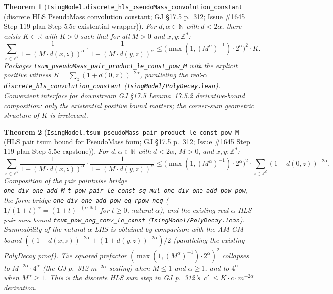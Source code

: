 \documentclass[a4paper,11pt]{article}
\newtheorem{theorem}{Theorem}
\begin{document}
\begin{theorem}[\texttt{IsingModel.discrete\_hls\_pseudoMass\_convolution\_constant}
(discrete HLS PseudoMass convolution constant; GJ \S17.5 p.~312;
Issue \#1645 Step 119 plan Step 5.5c existential wrapper)]
For $d, \alpha \in \mathbb{N}$ with $d < 2\alpha$, there exists $K \in \mathbb{R}$
with $K > 0$ such that for all $M > 0$ and $x, y : \mathbb{Z}^d$:
\[
  \sum_{z \in \mathbb{Z}^d}
    \frac{1}{1+(M\cdot d(x,z))^\alpha}\cdot\frac{1}{1+(M\cdot d(y,z))^\alpha}
  \le \bigl(\max(1, (M^\alpha)^{-1})\cdot 2^\alpha\bigr)^2 \cdot K.
\]
Packages \texttt{tsum\_pseudoMass\_pair\_product\_le\_const\_pow\_M} with the
explicit positive witness $K = \sum_z (1 + d(0, z))^{-2\alpha}$, paralleling
the real-$\alpha$ \texttt{discrete\_hls\_convolution\_constant}
(\texttt{IsingModel/PolyDecay.lean}). Convenient interface for downstream GJ
\S17.5 Lemma~17.5.2 derivative-bound composition: only the existential positive
bound matters; the corner-sum geometric structure of $K$ is irrelevant.
\end{theorem}

\begin{theorem}[\texttt{IsingModel.tsum\_pseudoMass\_pair\_product\_le\_const\_pow\_M}
(HLS pair tsum bound for PseudoMass form; GJ \S17.5 p.~312;
Issue \#1645 Step 119 plan Step 5.5c capstone)]
For $d, \alpha \in \mathbb{N}$ with $d < 2\alpha$, $M > 0$, and
$x, y : \mathbb{Z}^d$:
\[
  \sum_{z \in \mathbb{Z}^d}
    \frac{1}{1+(M\cdot d(x,z))^\alpha}\cdot\frac{1}{1+(M\cdot d(y,z))^\alpha}
  \le \bigl(\max(1, (M^\alpha)^{-1})\cdot 2^\alpha\bigr)^2
      \cdot \sum_{z \in \mathbb{Z}^d} (1 + d(0, z))^{-2\alpha}.
\]
Composition of the pair pointwise bridge
\texttt{one\_div\_one\_add\_M\_t\_pow\_pair\_le\_const\_sq\_mul\_one\_div\_one\_add\_pow\_pow},
the form bridge \texttt{one\_div\_one\_add\_pow\_eq\_rpow\_neg}
($1/(1+t)^\alpha = (1+t)^{-(\alpha:\mathbb{R})}$ for $t \ge 0$, natural $\alpha$),
and the existing real-$\alpha$ HLS pair-sum bound
\texttt{tsum\_pow\_neg\_conv\_le\_const} (\texttt{IsingModel/PolyDecay.lean}).
Summability of the natural-$\alpha$ LHS is obtained by comparison with the
AM-GM bound $((1+d(x,z))^{-2\alpha}+(1+d(y,z))^{-2\alpha})/2$ (paralleling the
existing PolyDecay proof). The squared prefactor
$(\max(1, (M^\alpha)^{-1})\cdot 2^\alpha)^2$ collapses to $M^{-2\alpha}\cdot 4^\alpha$
(the GJ p.~312 $m^{-2\alpha}$ scaling) when $M\le 1$ and $\alpha\ge 1$, and to
$4^\alpha$ when $M^\alpha\ge 1$. This is the discrete HLS sum step in GJ
p.~312's $|c'|\le K\cdot c\cdot m^{-2\alpha}$ derivation.
\end{theorem}
\end{document}
